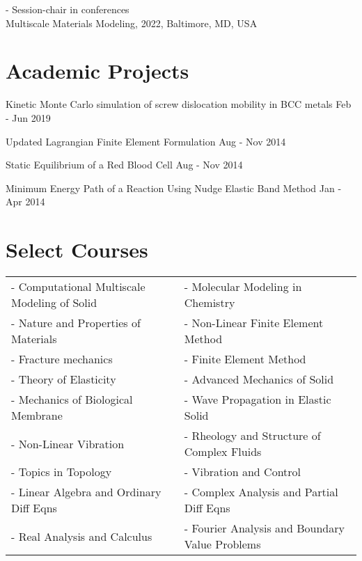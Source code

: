 \documentclass[margin,line]{resume}
\begin{document}
\begin{resume}
    - Session-chair in conferences \\
    \hspace*{0.5cm} Multiscale Materials Modeling, 2022, Baltimore, MD, USA


    \section{\mysidestyle Academic Projects}

    Kinetic Monte Carlo simulation of screw dislocation mobility in BCC metals  \hfill \small{Feb - Jun 2019}

    \vspace{-0.3cm}
    Updated Lagrangian Finite Element Formulation  \hfill \small{Aug - Nov 2014}

    \vspace{-0.3cm}
    Static Equilibrium of a Red Blood Cell \hfill \small{Aug - Nov 2014}

    \vspace{-0.3cm}
    Minimum Energy Path of a Reaction Using Nudge Elastic Band Method \hfill \small{Jan - Apr 2014}




    \section{\mysidestyle Select Courses}

    \begin{tabular}{@{}p{7.5cm}p{7.5cm}}
        - Computational Multiscale Modeling of Solid & - Molecular Modeling in Chemistry              \\
        - Nature and Properties of Materials         & -  Non-Linear Finite Element Method            \\
        - Fracture mechanics                         & - Finite Element Method                        \\
        - Theory of Elasticity                       & - Advanced Mechanics of Solid                  \\
        - Mechanics of Biological Membrane           & - Wave Propagation in Elastic Solid            \\
        - Non-Linear Vibration                       & -	Rheology and Structure of Complex Fluids     \\
        - Topics in Topology                         & - Vibration and Control                        \\
        - Linear Algebra and Ordinary Diff Eqns      & - Complex Analysis and Partial Diff Eqns       \\
        - Real Analysis and Calculus                 & - Fourier Analysis and Boundary Value Problems
    \end{tabular}


\end{resume}
\end{document}

